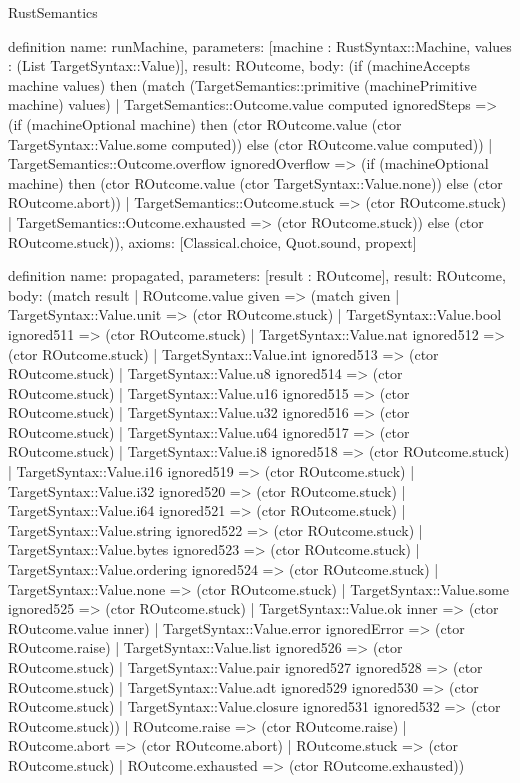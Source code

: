 \begin{lexlean}{RustSemantics}
\begin{semanticmodule}
definition{
  name: runMachine,
  parameters: [machine : RustSyntax::Machine, values : (List TargetSyntax::Value)],
  result: ROutcome,
  body: (if (machineAccepts machine values) then (match (TargetSemantics::primitive (machinePrimitive machine) values)
    | TargetSemantics::Outcome.value computed ignoredSteps => (if (machineOptional machine) then (ctor ROutcome.value (ctor TargetSyntax::Value.some computed)) else (ctor ROutcome.value computed))
    | TargetSemantics::Outcome.overflow ignoredOverflow => (if (machineOptional machine) then (ctor ROutcome.value (ctor TargetSyntax::Value.none)) else (ctor ROutcome.abort))
    | TargetSemantics::Outcome.stuck => (ctor ROutcome.stuck)
    | TargetSemantics::Outcome.exhausted => (ctor ROutcome.stuck)) else (ctor ROutcome.stuck)),
  axioms: [Classical.choice, Quot.sound, propext]
}

definition{
  name: propagated,
  parameters: [result : ROutcome],
  result: ROutcome,
  body: (match result
    | ROutcome.value given => (match given
      | TargetSyntax::Value.unit => (ctor ROutcome.stuck)
      | TargetSyntax::Value.bool ignored511 => (ctor ROutcome.stuck)
      | TargetSyntax::Value.nat ignored512 => (ctor ROutcome.stuck)
      | TargetSyntax::Value.int ignored513 => (ctor ROutcome.stuck)
      | TargetSyntax::Value.u8 ignored514 => (ctor ROutcome.stuck)
      | TargetSyntax::Value.u16 ignored515 => (ctor ROutcome.stuck)
      | TargetSyntax::Value.u32 ignored516 => (ctor ROutcome.stuck)
      | TargetSyntax::Value.u64 ignored517 => (ctor ROutcome.stuck)
      | TargetSyntax::Value.i8 ignored518 => (ctor ROutcome.stuck)
      | TargetSyntax::Value.i16 ignored519 => (ctor ROutcome.stuck)
      | TargetSyntax::Value.i32 ignored520 => (ctor ROutcome.stuck)
      | TargetSyntax::Value.i64 ignored521 => (ctor ROutcome.stuck)
      | TargetSyntax::Value.string ignored522 => (ctor ROutcome.stuck)
      | TargetSyntax::Value.bytes ignored523 => (ctor ROutcome.stuck)
      | TargetSyntax::Value.ordering ignored524 => (ctor ROutcome.stuck)
      | TargetSyntax::Value.none => (ctor ROutcome.stuck)
      | TargetSyntax::Value.some ignored525 => (ctor ROutcome.stuck)
      | TargetSyntax::Value.ok inner => (ctor ROutcome.value inner)
      | TargetSyntax::Value.error ignoredError => (ctor ROutcome.raise)
      | TargetSyntax::Value.list ignored526 => (ctor ROutcome.stuck)
      | TargetSyntax::Value.pair ignored527 ignored528 => (ctor ROutcome.stuck)
      | TargetSyntax::Value.adt ignored529 ignored530 => (ctor ROutcome.stuck)
      | TargetSyntax::Value.closure ignored531 ignored532 => (ctor ROutcome.stuck))
    | ROutcome.raise => (ctor ROutcome.raise)
    | ROutcome.abort => (ctor ROutcome.abort)
    | ROutcome.stuck => (ctor ROutcome.stuck)
    | ROutcome.exhausted => (ctor ROutcome.exhausted))
}


\end{semanticmodule}
\end{lexlean}
